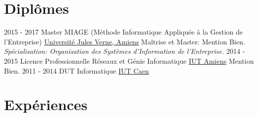 \documentclass[letterpaper]{twentysecondcv} %
\begin{document}
\makeprofile %

\section{Diplômes}
\begin{twenty} %
	\twentyitem
    	{2015 - 2017}
        {Master MIAGE (Méthode Informatique Appliquée à la Gestion de l'Entreprise)}
        {\href{http://miage.mastersticamiens.fr/}{Université Jules Verne, Amiens}}
        {Maîtrise et Master: Mention Bien.}
        {\textit{Spécialisation: Organisation des Systèmes d'Information de l'Entreprise.}}
	\twentyitem
    	{2014 - 2015}
        {Licence Professionnelle Réseaux et Génie Informatique}
        {\href{https://www.u-picardie.fr/catalogue-formations/co/Catalogue_UPJV/co/LP_ResComm_ResGenieInfo.html}{IUT Amiens}}
        {Mention Bien.}
        {}
    \twentyitem
    	{2011 - 2014}
        {DUT  Informatique}
        {\href{https://uniform.unicaen.fr/catalogue/formation/dut/5267-dut-informatique?s=iut-caen&r=1291042344184}{IUT Caen}}
        {}{}
\end{twenty}


\section{Expériences}
\end{document}
